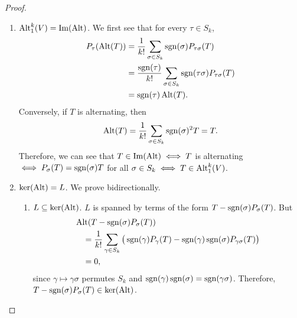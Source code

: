 \begin{proof}
\begin{enumerate}
			\item \textit{$\operatorname{Alt}^k_1(V) = \operatorname{Im}(\operatorname{Alt})$}. We first see that for every $\tau \in S_k$,
				\begin{align}
					P_\tau(\operatorname{Alt}(T))
					&= \frac{1}{k!} \sum_{\sigma \in S_k} \operatorname{sgn}(\sigma) P_{\tau\sigma}(T)\\
					&= \frac{\operatorname{sgn}(\tau)}{k!} \sum_{\sigma \in S_k} \operatorname{sgn}(\tau\sigma) P_{\tau\sigma}(T)\\
					&= \operatorname{sgn}(\tau)\operatorname{Alt}(T).
				\end{align}
				Conversely, if $T$ is alternating, then
				\begin{equation}
					\operatorname{Alt}(T) = \frac{1}{k!} \sum_{\sigma \in S_k} \operatorname{sgn}(\sigma)^2 T = T.
				\end{equation}
				Therefore, we can see that $T \in \operatorname{Im}(\operatorname{Alt}) \iff T$ is alternating $\iff P_\sigma(T) = \operatorname{sgn}(\sigma)T$ for all $\sigma \in S_k \iff T \in \operatorname{Alt}^k_1(V)$.

			\item \textit{$\ker(\operatorname{Alt}) = L$}. We prove bidirectionally.
				\begin{enumerate}
					\item $L \subseteq \ker(\operatorname{Alt})$. $L$ is spanned by terms of the form $T - \operatorname{sgn}(\sigma)P_\sigma(T)$. But
						\begin{align}
							&\operatorname{Alt}(T - \operatorname{sgn}(\sigma)P_\sigma(T))\\
							&\quad = \frac{1}{k!}\sum_{\gamma \in S_k}
							\big(\operatorname{sgn}(\gamma)P_\gamma(T)
							- \operatorname{sgn}(\gamma)\operatorname{sgn}(\sigma)P_{\gamma\sigma}(T)\big)\\
							&\quad = 0,
						\end{align}
						since $\gamma \mapsto \gamma\sigma$ permutes $S_k$ and $\operatorname{sgn}(\gamma)\operatorname{sgn}(\sigma)=\operatorname{sgn}(\gamma\sigma)$. Therefore, $T - \operatorname{sgn}(\sigma)P_\sigma(T) \in \ker(\operatorname{Alt})$.


\end{enumerate}
\end{enumerate}
\end{proof}
